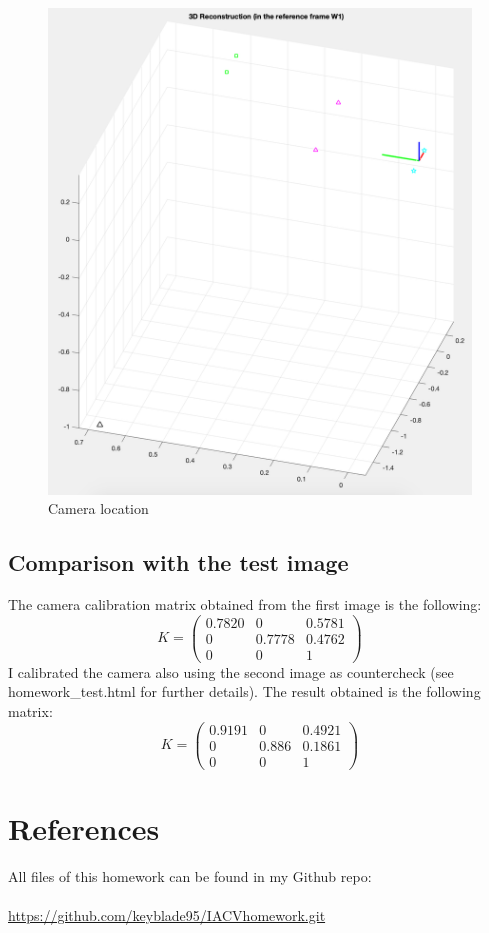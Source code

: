 \documentclass{article}
\begin{document}
\begin{figure}[hbt!]
\centering
\includegraphics[scale=0.45]{images/cameralocation.png}
\caption{Camera location}
\label{fig:cameralocation}
\end{figure}

\newpage
\subsection{Comparison with the test image}
The camera calibration matrix obtained from the first image is the following:
$$ K = \begin{pmatrix}
0.7820 & 0 & 0.5781 \\
0 & 0.7778 & 0.4762 \\
0 & 0 & 1
\end{pmatrix} $$
I calibrated the camera also using the second image as countercheck (see homework\_test.html for further details). The result obtained is the following matrix:
$$ K = \begin{pmatrix}
0.9191 & 0 & 0.4921 \\
0 & 0.886 & 0.1861 \\
0 & 0 & 1
\end{pmatrix} $$

\newpage
\section{References}
All files of this homework can be found in my Github repo: \\
\\
\url{https://github.com/keyblade95/IACVhomework.git}

\newpage


\end{document}
